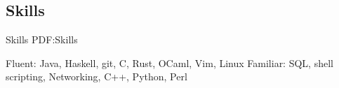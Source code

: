 \documentclass[letterpaper,10pt,oneside]{simpleresume}
\begin{document}
\begin{minipage}[t][0pt]{\linewidth}
\begin{body}





\section%
{Skills}
{Skills}
{PDF:Skills}

Fluent: Java, Haskell, git, C, Rust, OCaml, Vim, Linux
\GapNoBreak%
Familiar: SQL, shell scripting, Networking, C++, Python, Perl

\end{body}
\end{minipage}
\end{document}
